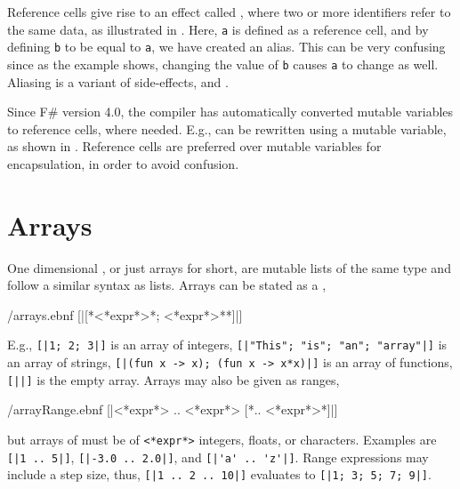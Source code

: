 \documentclass[fsharpNotes.tex]{subfiles}
\begin{document}
Reference cells give rise to an effect called , where two or more identifiers refer to the same data, as illustrated in .
%
%
Here, \lstinline!a! is defined as a reference cell, and by defining \lstinline!b! to be equal to \lstinline!a!, we have created an alias. This can be very confusing since as the example shows, changing the value of \lstinline!b! causes \lstinline!a! to change as well. Aliasing is a variant of side-effects, and .

Since F\# version 4.0, the compiler has automatically converted mutable variables to reference cells, where needed.  E.g.,  can be rewritten using a mutable variable, as shown in .
% 
% 
Reference cells are preferred over mutable variables for encapsulation, in order to avoid confusion.

\section{Arrays}
\label{sec:arrays}
One dimensional , or just arrays for short, are mutable lists of the same type and follow a similar syntax as lists. Arrays can be stated as a ,
%
\begin{verbatimwrite}{\ebnf/arrays.ebnf}
[|[*<*expr*>{*; <*expr*>*}*]|]
\end{verbatimwrite}
%
E.g., \mbox{\lstinline![|1; 2; 3|]!} is an array of integers, \mbox{\lstinline![|"This"; "is"; "an"; "array"|]!} is an array of strings, \mbox{\lstinline![|(fun x -> x); (fun x -> x*x)|]!} is an array of functions, \lstinline![||]! is the empty array.  Arrays may also be given as ranges,
%
\begin{verbatimwrite}{\ebnf/arrayRange.ebnf}
[|<*expr*> .. <*expr*> [*.. <*expr*>*]|]
\end{verbatimwrite}
%
but arrays of  must be of \lstinline[language=syntax]{<*expr*>} integers, floats, or characters. Examples are \mbox{\lstinline![|1 .. 5|]!}, \mbox{\lstinline![|-3.0 .. 2.0|]!}, and \mbox{\lstinline![|'a' .. 'z'|]!}. Range expressions may include a step size, thus, \mbox{\lstinline![|1 .. 2 .. 10|]!} evaluates to \mbox{\lstinline![|1; 3; 5; 7; 9|]!}.
\end{document}
